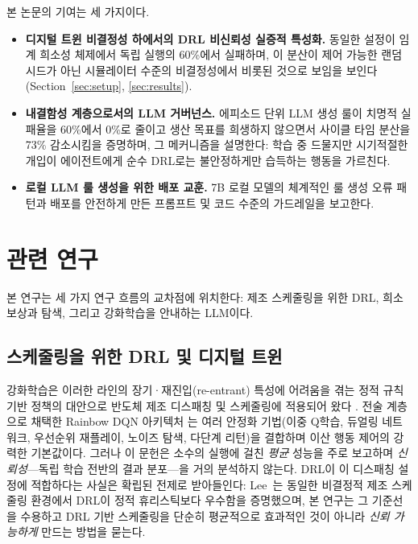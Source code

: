 \documentclass[10pt]{article}
\begin{document}
본 논문의 기여는 세 가지이다.
\begin{itemize}
\setlength\itemsep{0em}
\item \textbf{디지털 트윈 비결정성 하에서의 DRL 비신뢰성 실증적 특성화.}
동일한 설정이 임계 희소성 체제에서 독립 실행의 60\%에서 실패하며,
이 분산이 제어 가능한 랜덤 시드가 아닌 시뮬레이터 수준의 비결정성에서 비롯된 것으로 보임을 보인다
(Section~\ref{sec:setup}, \ref{sec:results}).
\item \textbf{내결함성 계층으로서의 LLM 거버넌스.} 에피소드 단위 LLM 생성
룰이 치명적 실패율을 60\%에서 0\%로 줄이고 생산 목표를 희생하지 않으면서
사이클 타임 분산을 73\% 감소시킴을 증명하며, 그 메커니즘을 설명한다:
학습 중 드물지만 시기적절한 개입이 에이전트에게 순수 DRL로는 불안정하게만
습득하는 행동을 가르친다.
\item \textbf{로컬 LLM 룰 생성을 위한 배포 교훈.} 7B 로컬 모델의 체계적인
룰 생성 오류 패턴과 배포를 안전하게 만든 프롬프트 및 코드 수준의 가드레일을 보고한다.
\end{itemize}


\section{관련 연구}
\label{sec:related}

본 연구는 세 가지 연구 흐름의 교차점에 위치한다: 제조 스케줄링을 위한 DRL,
희소 보상과 탐색, 그리고 강화학습을 안내하는 LLM이다.

\subsection{스케줄링을 위한 DRL 및 디지털 트윈}
강화학습은 이러한 라인의 장기·재진입(re-entrant) 특성에 어려움을 겪는 정적
규칙 기반 정책의 대안으로 반도체 제조 디스패칭 및 스케줄링에 적용되어 왔다
\cite{waschneck2018,hu2019}. 전술 계층으로 채택한 Rainbow DQN 아키텍처
\cite{hessel2018}는 여러 안정화 기법(이중 Q학습, 듀얼링 네트워크, 우선순위
재플레이, 노이즈 탐색, 다단계 리턴)을 결합하며 이산 행동 제어의 강력한
기본값이다. 그러나 이 문헌은 소수의 실행에 걸친 \emph{평균} 성능을 주로 보고하며
\emph{신뢰성}---독립 학습 전반의 결과 분포---을 거의 분석하지 않는다.
DRL이 이 디스패칭 설정에 적합하다는 사실은 확립된 전제로 받아들인다:
Lee~\cite{lee2025}는 동일한 비결정적 제조 스케줄링 환경에서 DRL이 정적 휴리스틱보다
우수함을 증명했으며, 본 연구는 그 기준선을 수용하고 DRL 기반 스케줄링을
단순히 평균적으로 효과적인 것이 아니라 \emph{신뢰 가능하게} 만드는 방법을 묻는다.
\end{document}

